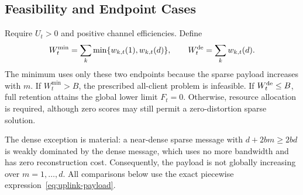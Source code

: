 \subsection{Feasibility and Endpoint Cases}
Require $U_t>0$ and positive channel efficiencies. Define
\begin{equation}
 W_t^{\min}=\sum_k\min\{w_{k,t}(1),w_{k,t}(d)\},\qquad
 W_t^{\mathrm{de}}=\sum_kw_{k,t}(d).
 \label{eq:endpoint-costs}
\end{equation}
The minimum uses only these two endpoints because the sparse payload increases with $m$. If $W_t^{\min}>B$, the prescribed all-client problem is infeasible. If $W_t^{\mathrm{de}}\le B$, full retention attains the global lower limit $F_t=0$. Otherwise, resource allocation is required, although zero scores may still permit a zero-distortion sparse solution.

The dense exception is material: a near-dense sparse message with $d+2bm\ge2bd$ is weakly dominated by the dense message, which uses no more bandwidth and has zero reconstruction cost. Consequently, the payload is not globally increasing over $m=1,\ldots,d$. All comparisons below use the exact piecewise expression~\eqref{eq:uplink-payload}.
